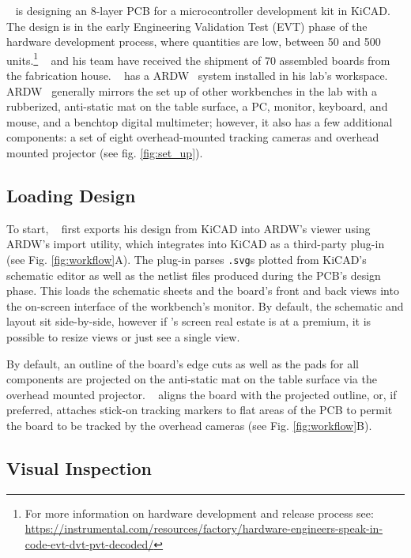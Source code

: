 \documentclass [11pt, proquest] {uwthesis}[2020/02/24]
\newcommand{\ARDWname}{ARDW}
\begin{document}
\personname~ is designing an 8-layer PCB for a microcontroller development kit in KiCAD. The design is in the early Engineering Validation Test (EVT) phase of the hardware development process, where quantities are low, between 50 and 500 units.\footnote{For more information on hardware development and release process see: \url{https://instrumental.com/resources/factory/hardware-engineers-speak-in-code-evt-dvt-pvt-decoded/}} \personname~ and his team have received the shipment of 70 assembled boards from the fabrication house. \personname~ has a \ARDWname~ system installed in his lab's workspace. \ARDWname~ generally mirrors the set up of other workbenches in the lab with a rubberized, anti-static mat on the table surface, a PC, monitor, keyboard, and mouse, and a benchtop digital multimeter; however, it also has a few additional components: a set of eight overhead-mounted tracking cameras and overhead mounted projector (see fig. \ref{fig:set_up}).

\subsection{Loading Design}

To start, \personname~ first exports his design from KiCAD into \ARDWname’s viewer using \ARDWname's import utility, which integrates into KiCAD as a third-party plug-in (see Fig. \ref{fig:workflow}A). The plug-in parses \verb|.svg|s plotted from KiCAD’s schematic editor as well as the netlist files produced during the PCB’s design phase. This loads the schematic sheets and the board’s front and back views into the on-screen interface of the workbench’s monitor.
By default, the schematic and layout sit side-by-side, however if \personname’s screen real estate is at a premium, it is possible to resize views or just see a single view.

By default, an outline of the board's edge cuts as well as the pads for all components are projected on the anti-static mat on the table surface via the overhead mounted projector.
\personname~ aligns the board with the projected outline, or, if preferred, attaches stick-on tracking markers to flat areas of the PCB to permit the board to be tracked by the overhead cameras (see Fig. \ref{fig:workflow}B).

\subsection{Visual Inspection}
\end{document}
